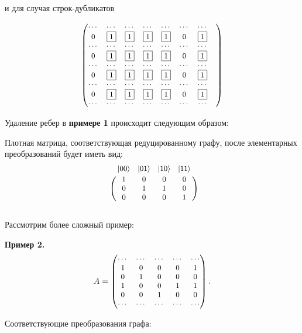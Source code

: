 \begin{figure}[h!]
	\noindent{}
\end{figure}

\noindent и для случая строк-дубликатов

\[
{\small
\begin{pmatrix}
    \cdots & \cdots & \cdots & \cdots & \cdots & \cdots & \cdots & \cr
    0 & \fbox{1} & \fbox{1} & \fbox{1} & \fbox{1} & 0 & \fbox{1} \cr
    \cdots & \cdots & \cdots & \cdots & \cdots & \cdots & \cdots & \cr
    0 & \fbox{1} & \fbox{1} & \fbox{1} & \fbox{1} & 0 & \fbox{1} \cr
    \cdots & \cdots & \cdots & \cdots & \cdots & \cdots & \cdots & \cr
    0 & \fbox{1} & \fbox{1} & \fbox{1} & \fbox{1} & 0 & \fbox{1} \cr
    \cdots & \cdots & \cdots & \cdots & \cdots & \cdots & \cdots & \cr
    0 & \fbox{1} & \fbox{1} & \fbox{1} & \fbox{1} & 0 & \fbox{1} \cr
    \cdots & \cdots & \cdots & \cdots & \cdots & \cdots & \cdots
\end{pmatrix}
}
\]

\begin{figure}[h!]
	\noindent{}
\end{figure}

\clearpage
Удаление ребер в \textbf{примере 1} происходит следующим образом:

\begin{figure}[h!]
	\noindent{}
\end{figure}

Плотная матрица, соответствующая редуцированному графу, после эле­ментарных преобразований будет иметь вид:
\[
{\small
	\bordermatrix{
		& |00\ra & |01\ra & |10\ra & |11\ra \cr
		& 1 & 0 & 0 & 0 \cr
		& 0 & 1 & 1 & 0 \cr
		& 0 & 0 & 0 & 1
	}
}
\]
\
\\[12pt]
\noindent Рассмотрим более сложный пример:

\noindent\textbf{Пример 2.}
\[
{\small
A =
\begin{pmatrix}
	\cdots & \cdots & \cdots & \cdots & \cdots\\
	1 & 0 & 0 & 0 & 1 \cr
	0 & 1 & 0 & 0 & 0 \cr
	1 & 0 & 0 & 1 & 1 \cr
	0 & 0 & 1 & 0 & 0 \cr
	\cdots & \cdots & \cdots & \cdots & \cdots
\end{pmatrix}.
}
\]

\noindent Соответствующие преобразования графа:
\begin{figure}[h]
	\noindent{}
	\label{figCurves}
\end{figure}

